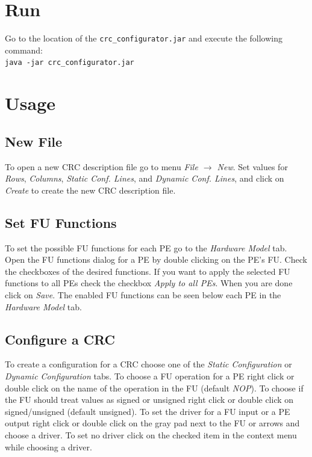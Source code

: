 \documentclass{article}
\begin{document}
\section*{Run}
Go to the location of the \texttt{crc\_configurator.jar} and execute the following command:\\[2mm]
\texttt{java -jar crc\_configurator.jar}\\[2mm]

\section*{Usage}
\subsection*{New File}

To open a new CRC description file go to menu \textit{File $\rightarrow$ New}. Set values for \textit{Rows}, \textit{Columns}, \textit{Static Conf. Lines}, and \textit{Dynamic Conf. Lines}, and click on \textit{Create} to create the new CRC description file.

\subsection*{Set FU Functions}
To set the possible FU functions for each PE go to the \textit{Hardware Model} tab. Open the FU functions dialog for a PE by double clicking on the PE's FU. Check the checkboxes of the desired functions. If you want to apply the selected FU functions to all PEs check the checkbox \textit{Apply to all PEs}. When you are done click on \textit{Save}. The enabled FU functions can be seen below each PE in the \textit{Hardware Model} tab.

\subsection*{Configure a CRC}
To create a configuration for a CRC choose one of the \textit{Static Configuration} or \textit{Dynamic Configuration} tabs. To choose a FU operation for a PE right click or double click on the name of the operation in the FU (default \textit{NOP}). To choose  if the FU should treat values as signed or unsigned right click or double click on signed/unsigned (default unsigned). To set the driver for a FU input or a PE output right click or double click on the gray pad next to the FU or arrows and choose a driver. To set no driver click on the checked item in the context menu while choosing a driver.
\end{document}
